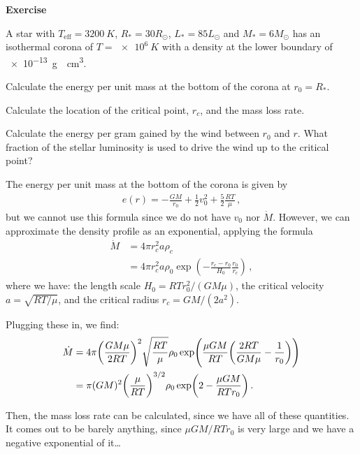 \documentclass[main.tex]{subfiles}
\begin{document}
\begin{greenbox}
    \textbf{Exercise}

  A star with \(T _{\text{eff}} = \SI{3200}{K}\), \(R_{*} = 30 R_{\odot}\), \(L_{*} = 85 L_{\odot}\) and \(M_{*} = 6 M_{\odot}\) has an isothermal corona of \(T = \SI{e6}{K}\) with a density at the lower boundary of \SI{e-13}{g \per\centi\metre\cubed}.

  Calculate the energy per unit mass at the bottom of the corona at \(r_0 = R_{*}\).

  Calculate the location of the critical point, \(r_c\), and the mass loss rate.

  Calculate the energy per gram gained by the wind between \(r_0 \) and \(r\). What fraction of the stellar luminosity is used to drive the wind up to the critical point?
\end{greenbox}

\begin{bluebox}
  The energy per unit mass at the bottom of the corona is given by 
  \begin{align}
    e(r) = - \frac{GM}{r_0 } + \frac{1}{2} v_0^2 + \frac{5}{2} \frac{RT}{\mu }
  \,,
  \end{align}
but we cannot use this formula since we do not have \(v_0 \) nor \(\dot{M}\). However, we can approximate the density profile as an exponential, applying the formula 
%
\begin{subequations}
\begin{align}
  \dot{M} &= 4 \pi r_c^2 a \rho_{c}  \\
  &= 4 \pi r_c^2 a \rho_0 \exp(- \frac{r_c - r_0 }{H_0 } \frac{r_0 }{r_c})  
\,,
\end{align}
\end{subequations}
%
where we have: the length scale \(H_0 = RT r_0^2 / (GM \mu )\), the critical velocity \(a = \sqrt{RT/\mu }\), and the critical radius \(r_c = GM/(2a^2)\).

Plugging these in, we find: 
%
\begin{subequations}
\begin{align}
  \dot{M} &= 4 \pi \qty(\frac{GM \mu }{2 RT})^2 \sqrt{\frac{RT}{\mu }} \rho_0 
  \exp(\frac{\mu GM}{RT} \qty(\frac{2RT}{GM \mu } - \frac{1}{r_0 }))  \\
  &= \pi (GM)^2 \qty(\frac{\mu }{RT})^{3/2} \rho_0 
  \exp(2 - \frac{\mu GM}{RT r_0 })
\,.
\end{align}
\end{subequations}
%

Then, the mass loss rate can be calculated, since we have all of these quantities. It comes out to be barely anything, since \(\mu GM / RT r_0 \) is very large and we have a negative exponential of it\dots

\end{bluebox}
\end{document}

